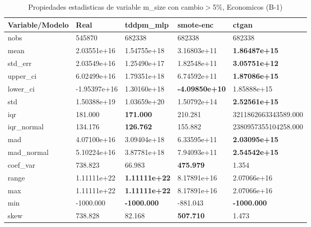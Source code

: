 \begin{table}[H]
\centering
\fontsize{8}{14}\selectfont
\caption{Propiedades estadisticas de variable m\_size con cambio\ensuremath{>}5\%, Economicos (B-1)}
\label{table-stats-economicos-b-1-m_size-short}
\begin{tabular}{|l|m{10em}|m{10em}|m{10em}|m{10em}|}
\hline
 \rowcolor[gray]{0.8}
Variable/Modelo & Real & tddpm\_mlp & smote-enc & ctgan \\
\hline nobs & 545870 & 682338 & 682338 & 682338 \\
\hline mean & 2.03551e+16 & \cellcolor[rgb]{0.9, 0.54, 0.52} 1.54755e+18 & 3.16803e+11 & \bfseries 1.86487e+15 \\
\hline std\_err & 2.03549e+16 & \cellcolor[rgb]{0.9, 0.54, 0.52} 1.25490e+17 & 1.82548e+11 & \bfseries 3.05751e+12 \\
\hline upper\_ci & 6.02499e+16 & \cellcolor[rgb]{0.9, 0.54, 0.52} 1.79351e+18 & 6.74592e+11 & \bfseries 1.87086e+15 \\
\hline lower\_ci & -1.95397e+16 & \cellcolor[rgb]{0.9, 0.54, 0.52} 1.30160e+18 & \bfseries -4.09850e+10 & 1.85888e+15 \\
\hline std & 1.50388e+19 & \cellcolor[rgb]{0.9, 0.54, 0.52} 1.03659e+20 & 1.50792e+14 & \bfseries 2.52561e+15 \\
\hline iqr & 181.000 & \bfseries 171.000 & 210.281 & \cellcolor[rgb]{0.9, 0.54, 0.52} 3211862663343589.000 \\
\hline iqr\_normal & 134.176 & \bfseries 126.762 & 155.882 & \cellcolor[rgb]{0.9, 0.54, 0.52} 2380957355104258.000 \\
\hline mad & 4.07100e+16 & \cellcolor[rgb]{0.9, 0.54, 0.52} 3.09404e+18 & 6.33595e+11 & \bfseries 2.03095e+15 \\
\hline mad\_normal & 5.10224e+16 & \cellcolor[rgb]{0.9, 0.54, 0.52} 3.87781e+18 & 7.94093e+11 & \bfseries 2.54542e+15 \\
\hline coef\_var & 738.823 & 66.983 & \bfseries 475.979 & \cellcolor[rgb]{0.9, 0.54, 0.52} 1.354 \\
\hline range & 1.11111e+22 & \bfseries 1.11111e+22 & 8.17891e+16 & \cellcolor[rgb]{0.9, 0.54, 0.52} 2.07066e+16 \\
\hline max & 1.11111e+22 & \bfseries 1.11111e+22 & 8.17891e+16 & \cellcolor[rgb]{0.9, 0.54, 0.52} 2.07066e+16 \\
\hline min & -1000.000 & \bfseries -1000.000 & \cellcolor[rgb]{0.9, 0.54, 0.52} -881.043 & \bfseries -1000.000 \\
\hline skew & 738.828 & 82.168 & \bfseries 507.710 & \cellcolor[rgb]{0.9, 0.54, 0.52} 1.473 \\

\end{tabular}
\end{table}
